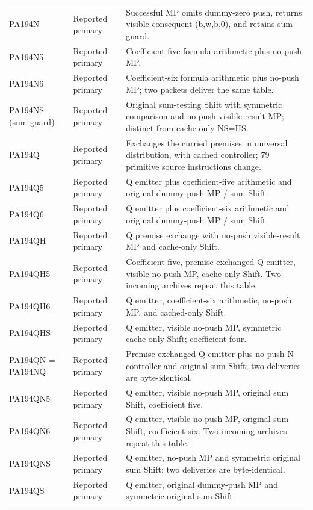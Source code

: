 \begin{longtable}{@{}p{.25\linewidth}p{.17\linewidth}p{.53\linewidth}@{}}
PA194N & Reported primary & Successful MP omits dummy-zero push, returns visible consequent (b,w,b,0), and retains sum guard. \\
PA194N5 & Reported primary & Coefficient-five formula arithmetic plus no-push MP. \\
PA194N6 & Reported primary & Coefficient-six formula arithmetic plus no-push MP; two packets deliver the same table. \\
PA194NS (sum guard) & Reported primary & Original sum-testing Shift with symmetric comparison and no-push visible-result MP; distinct from cache-only NS=HS. \\
PA194Q & Reported primary & Exchanges the curried premises in universal distribution, with cached controller; 79 primitive source instructions change. \\
PA194Q5 & Reported primary & Q emitter plus coefficient-five arithmetic and original dummy-push MP / sum Shift. \\
PA194Q6 & Reported primary & Q emitter plus coefficient-six arithmetic and original dummy-push MP / sum Shift. \\
PA194QH & Reported primary & Q premise exchange with no-push visible-result MP and cache-only Shift. \\
PA194QH5 & Reported primary & Coefficient five, premise-exchanged Q emitter, visible no-push MP, cache-only Shift. Two incoming archives repeat this table. \\
PA194QH6 & Reported primary & Q emitter, coefficient-six arithmetic, no-push MP, and cached-only Shift. \\
PA194QHS & Reported primary & Q emitter, visible no-push MP, symmetric cache-only Shift; coefficient four. \\
PA194QN = PA194NQ & Reported primary & Premise-exchanged Q emitter plus no-push N controller and original sum Shift; two deliveries are byte-identical. \\
PA194QN5 & Reported primary & Q emitter, visible no-push MP, original sum Shift, coefficient five. \\
PA194QN6 & Reported primary & Q emitter, visible no-push MP, original sum Shift, coefficient six. Two incoming archives repeat this table. \\
PA194QNS & Reported primary & Q emitter, no-push MP and symmetric original sum Shift; two deliveries are byte-identical. \\
PA194QS & Reported primary & Q emitter, original dummy-push MP and symmetric original sum Shift. \\

\end{longtable}

